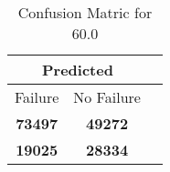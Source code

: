 \begin{table}[] 
\caption{Confusion Matric for 60.0} 
\label{Table: Prediction Accuracy-DMD60.0OnlySunEKF-combinationReflection-Reflection} 
\centering 
\begin{tabular} 
 {@{}ccc@{}} 
\toprule 
\multicolumn{2}{c}{\textbf{Predicted}}
 \\ \midrule 
\multicolumn{1}{|c|}{Failure} & 
\multicolumn{1}{c|}{No Failure}
 \\ \midrule 
\multicolumn{1}{|c|}{\color{green}\textbf{73497}} & 
\multicolumn{1}{c|}{\color{green}\textbf{49272}}
 \\ \midrule 
\multicolumn{1}{|c|}{\color{red}\textbf{19025}} & 
\multicolumn{1}{c|}{\color{red}\textbf{28334}}
 \\ \bottomrule 
\end{tabular} 
\end{table} 

